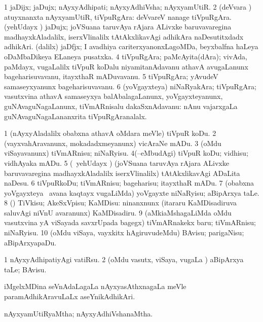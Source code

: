\bentry
{}
\gl{\nA}
\bmng
\bnum
\num{1} jaDijx; jaDujx; nAyxyAdhipati; nAyxyAdhiVsha; nAyxyamUtiR. 
\num{2} (deVvara \vi) atuyxnanxta nAyxyamUtiR, tiVpuRgAra:  deVvareV nanage tiVpuRgAra. 
\banum
{} (yehUdayx \ca) jaDujx; joVSuana taruvAya rAjara ALivxke baruvavaregina madhayxkAladalilx, iserxVlinalilx tAtAkxlikavAgi adhikAra naDesutitxdadx adhikAri. 
 (\bava dalilx) jaDfjx; I avadhiya cariterxyanonxLagoMDa, beyxbalfna haLeya oDaMbaDikeya ELaneya pusatxka. 
\eanum
\numie
\num{4} tiVpuRgAra; paMcAyita(dAra); vivAda, paMdayx, \mo vugaLalilx tiVpuR koDalu niyamitanAdavanu athavA avugaLanunx bageharisuvavanu, itayxthaR mADuvavanu. 
\num{5} tiVpuRgAra; yAvudeV samaseyxyanunx bageharisuvavanu. 
\num{6} (yoVgayxteya) niNaRyakAra; tiVpuRgAra; vasutxvina athavA samaseyxya balAbalagaLanunx, yoVgayxteyanunx, guNAvaguNagaLanunx, tiVmARnisalu dakaSxnAdavanu:  nAnu vajarxgaLa guNAvaguNagaLananxrita tiVpuRgAranalalx. 
\enum
\emng
\eentry

\bentry
{}
\gl{\sakirx}
\bmng
\bnum
\num{1} (nAyxyAladalilx obabxna athavA oMdara meVle) tiVpuR koDu. 
\num{2} (vayxvahAravanunx, mokadadxmeyanunx) vicAraNe mADu. 
\num{3} (oMdu viSayavanunx) tiVmARnisu; niNaRyisu. 
\num{4}(--eMbudAgi) tiVpuR koDu; vidhisu; vidhAyaka mADu. 
\num{5} (\kanmu\ yehUdayx \ca) (joVSuana taruvAya rAjara ALivxke baruvavaregina madhayxkAladalilx iserxVlinalilx) tAtAkxlikavAgi ADaLita naDesu. 
\num{6} tiVpuRkoDu; tiVmARnisu; bageharisu; itayxthaR mADu. 
\num{7} (obabxna yoVgayxteya \vi\ avana kaqtayx \mo vugaLiMda) yoVgayxte niNaRyisu; aBipArxya taLe. 
\num{8} (\pArxparx) TiVkisu; AkeSxVpisu; KaMDisu:  ninanxnunx (itararu KaMDisadiruva saluvAgi niVnU avaranunx) KaMDisadiru. 
\num{9} (aMkiaMshagaLiMda oMdu vasutxvina yA viSayada savxrUpada bagegx) tiVmARnakekx baru; tiVmARnisu; niNaRyisu. 
\num{10} (oMdu viSaya, vayxkitx hAgiruvudeMdu) BAvisu; parigaNisu; aBipArxyapaDu. 
\enum
\emng

\noindent
\gl{\akirx}
\bmng
\bnum
\num{1} nAyxyAdhipatiyAgi vatiRsu. 
\num{2} (oMdu vasutx, viSaya, \mo vugaLa \vi) aBipArxya taLe; BAvisu. 
\enum
\emng
\eentry

\bentry
{}
\gl{\nA}
\bmng
iMgelxMDina seVnAdaLagaLa nAyxyasAthxnagaLa meVle paramAdhikAravuLaLx aseYnikAdhikAri. 
\emng
\eentry

\bentry
{}
\gl{\gu}
\bmng
nAyxyamUtiRyaMtha; nAyxyAdhiVshanaMtha. 
\emng
\eentry

